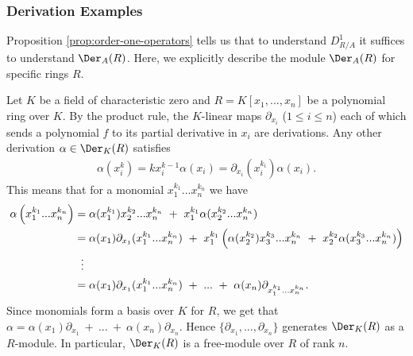 \subsubsection{Derivation Examples}
Proposition \ref{prop:order-one-operators} tells us that to understand $D^1_{R/A}$ it suffices to understand $\Der_A(R)$. Here, we explicitly describe the module $\Der_A(R)$ for specific rings $R$.
\begin{example}\label{example:derivations-of-poly-ring}
	Let $K$ be a field of characteristic zero and $R = K[x_1,...,x_n]$ be a polynomial ring over $K$. By the product rule, the $K$-linear maps $\partial_{x_i}$ ($1\leq i\leq n$) each of which sends a polynomial $f$ to its partial derivative in $x_i$ are derivations. Any other derivation $\alpha \in \Der_K(R)$ satisfies 
	\begin{align*}
		\alpha(x_i^k) = kx_i^{k-1}\alpha(x_i) = \partial_{x_i}(x_i^{k_i})\alpha(x_i).
	\end{align*}
	This means that for a monomial $x_1^{k_1}...x_n^{k_n}$ we have
	\begin{align*}
		\alpha \left(x_1^{k_1}...x_n^{k_n}\right) 
		  &= \alpha(x_1^{k_1})x_2^{k_2}...x_n^{k_n} ~+~ x_1^{k_1}\alpha(x_2^{k_2}...x_n^{k_n}) \\
		  &= \alpha(x_1)\partial_{x_1}(x_1^{k_1}...x_n^{k_n}) ~+~ x_1^{k_1}\left(\alpha(x_2^{k_2})x_3^{k_3}...x_n^{k_n} ~+~ x_2^{k_2}\alpha(x_3^{k_3}...x_n^{k_n})\right) \\
		  &\hspace{0.6em}\vdots \\
		  &= \alpha(x_1)\partial_{x_1}(x_1^{k_1}...x_n^{k_n}) ~+~ ... ~+~ \alpha(x_n)\partial_{x_1^{k_1}...x_n^{k_n}}.
	\end{align*}
	Since monomials form a basis over $K$ for $R$, we get that $\alpha = \alpha(x_1)\partial_{x_1}~+~...~+~\alpha(x_n)\partial_{x_n}$. Hence $\{\partial_{x_1},...,\partial_{x_n}\}$ generates $\Der_K(R)$ as a $R$-module. In particular, $\Der_K(R)$ is a free-module over $R$ of rank $n$.
\end{example}
